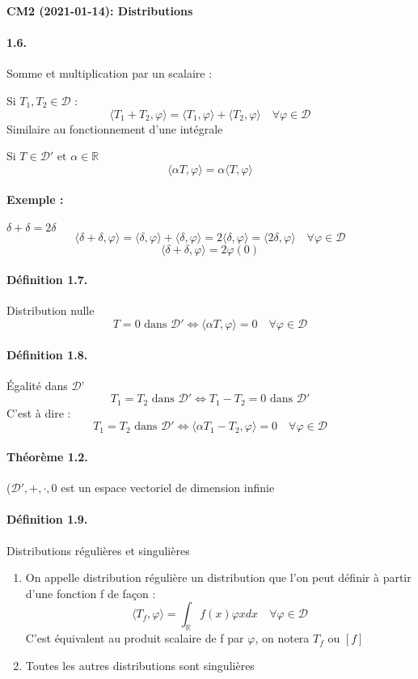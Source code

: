 \documentclass[12pt,a4paper]{report}
\newcommand{\ens}[1]{\ensuremath{\mathbb{#1}}}
\newcommand{\D}{\ensuremath{\mathcal{D}}}
\begin{document}
\begin{center}
\textbf{CM2 (2021-01-14): Distributions}
\end{center}

\paragraph{1.6.} Somme et multiplication par un scalaire :

Si \(T_1, T_2 \in \D\) :
\[
	\langle T_1 + T_2, \varphi \rangle = \langle T_1, \varphi \rangle + \langle T_2, \varphi \rangle \quad \forall \varphi \in \D
\]Similaire au fonctionnement d'une intégrale

Si \(T \in \D' \text{ et } \alpha \in \ens{R}\)
\[
	\langle \alpha T, \varphi \rangle = \alpha \langle T, \varphi \rangle
\]

\paragraph{Exemple :} \(\delta + \delta = 2\delta\)
\[
	\langle \delta + \delta, \varphi \rangle = \langle \delta, \varphi \rangle + \langle \delta, \varphi \rangle = 2 \langle \delta, \varphi \rangle =  \langle 2\delta, \varphi \rangle \quad \forall \varphi \in \D
\]
\[
	\langle \delta + \delta, \varphi \rangle = 2 \varphi(0)
\]
\paragraph{Définition 1.7.} Distribution nulle
\[
	T = 0 \text{ dans } \D' \Leftrightarrow \langle \alpha T, \varphi \rangle = 0\quad \forall \varphi \in \D
\]

\paragraph{Définition 1.8.} Égalité dans \D'
\[
	T_1 = T_2 \text{ dans } \D' \Leftrightarrow T_1 - T_2 = 0 \text{ dans } \D'
\]
C'est à dire :
\[
	T_1 = T_2 \text{ dans } \D' \Leftrightarrow \langle \alpha T_1 - T_2, \varphi \rangle = 0\quad \forall \varphi \in \D
\]

\paragraph{Théorème 1.2.} (\(\D',+, \cdot, 0\) est un espace vectoriel de dimension infinie

\paragraph{Définition 1.9.} Distributions régulières et singulières
\begin{enumerate}
	\item On appelle distribution régulière un distribution que l'on peut définir à partir d'une fonction f de façon :
	\[
		\langle T_f, \varphi \rangle = \int_{\ens{R}} f(x) \varphi{x} dx \quad \forall \varphi \in \D
	\]
	C'est équivalent au produit scalaire de f par \(\varphi\), on notera \(T_f\) ou \([f]\)
	\item Toutes les autres distributions sont singulières
\end{enumerate}
\end{document}
